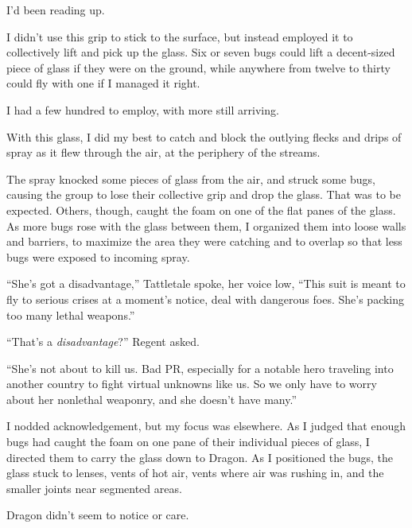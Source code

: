 I'd been reading up.



I didn't use this grip to stick to the surface, but instead employed it to collectively lift and pick up the glass.  Six or seven bugs could lift a decent-sized piece of glass if they were on the ground, while anywhere from twelve to thirty could fly with one if I managed it right.



I had a few hundred to employ, with more still arriving.



With this glass, I did my best to catch and block the outlying flecks and drips of spray as it flew through the air, at the periphery of the streams.



The spray knocked some pieces of glass from the air, and struck some bugs, causing the group to lose their collective grip and drop the glass.  That was to be expected.  Others, though, caught the foam on one of the flat panes of the glass.  As more bugs rose with the glass between them, I organized them into loose walls and barriers, to maximize the area they were catching and to overlap so that less bugs were exposed to incoming spray.



``She's got a disadvantage,'' Tattletale spoke, her voice low, ``This suit is meant to fly to serious crises at a moment's notice, deal with dangerous foes.  She's packing too many lethal weapons.''



``That's a \emph{disadvantage}?'' Regent asked.



``She's not about to kill us.  Bad PR, especially for a notable hero traveling into another country to fight virtual unknowns like us.  So we only have to worry about her nonlethal weaponry, and she doesn't have many.''



I nodded acknowledgement, but my focus was elsewhere.  As I judged that enough bugs had caught the foam on one pane of their individual pieces of glass, I directed them to carry the glass down to Dragon.  As I positioned the bugs, the glass stuck to lenses, vents of hot air, vents where air was rushing in, and the smaller joints near segmented areas.



Dragon didn't seem to notice or care.



